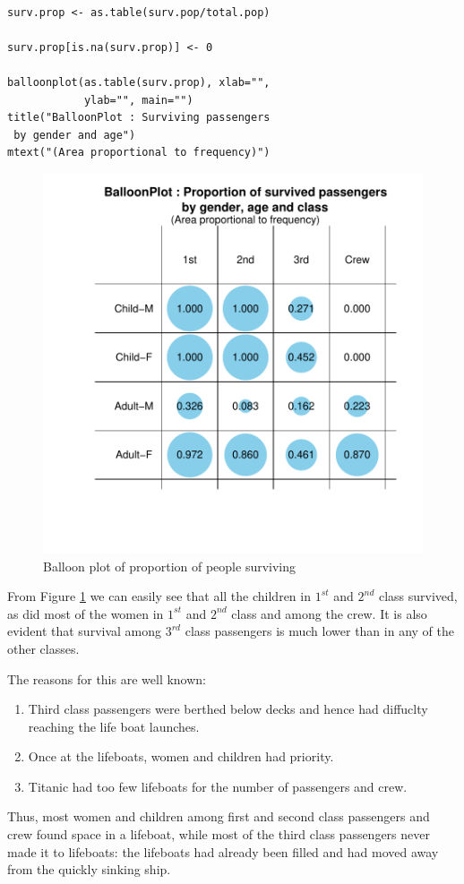 \documentclass[a4paper]{report}
\begin{document}
\begin{article}
{\small
\begin{verbatim}

surv.prop <- as.table(surv.pop/total.pop)

surv.prop[is.na(surv.prop)] <- 0

balloonplot(as.table(surv.prop), xlab="",
            ylab="", main="")
title("BalloonPlot : Surviving passengers
 by gender and age")
mtext("(Area proportional to frequency)")
\end{verbatim}
}


\begin{figure}
\includegraphics[width=\textwidth]{SurvivedProp.pdf}
\caption{\label{figure:Surv.Prop}
Balloon plot of proportion of people surviving}
\end{figure}

From Figure \ref{figure:Surv.Prop} we can easily see that all the
children in $1^{st}$ and $2^{nd}$ class survived, as did most of the
women in $1^{st}$ and $2^{nd}$ class and among the crew.  It is also
evident that survival among $3^{rd}$ class passengers is much lower
than in any of the other classes.

The reasons for this are well known: 
\begin{enumerate}
  \item Third class passengers were berthed below decks and hence
  had diffuclty reaching the life boat launches.
  \item Once at the lifeboats, women and children had priority.
  \item Titanic had too few lifeboats for the number of passengers and crew.
\end{enumerate}
Thus, most women and children among first and second class
passengers and crew found space in a lifeboat, while most of the
third class passengers never made it to lifeboats: the lifeboats had
already been filled and had moved away from the quickly sinking
ship.


\end{article}
\end{document}
